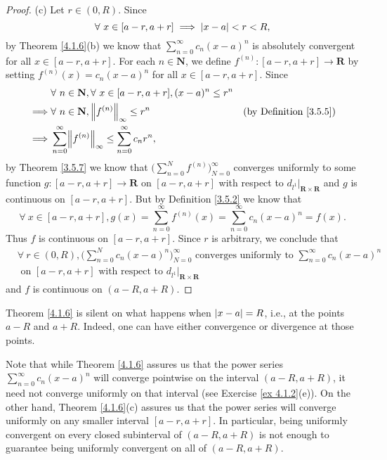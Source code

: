 \begin{proof}{(c)}
    Let \(r \in (0, R)\).
    Since
    \[
        \forall\ x \in [a - r, a + r] \implies \abs*{x - a} < r < R,
    \]
    by Theorem \ref{4.1.6}(b) we know that \(\sum_{n = 0}^\infty c_n (x - a)^n\) is absolutely convergent for all \(x \in [a - r, a + r]\).
    For each \(n \in \mathbf{N}\), we define \(f^{(n)} : [a - r, a + r] \to \mathbf{R}\) by setting \(f^{(n)}(x) = c_n (x - a)^n\) for all \(x \in [a - r, a + r]\).
    Since
    \begin{align*}
                 & \forall\ n \in \mathbf{N}, \forall\ x \in [a - r, a + r], (x - a)^n \leq r^n                                      \\
        \implies & \forall\ n \in \mathbf{N}, \norm*{f^{(n)}}_\infty \leq r^n                   & \text{(by Definition \ref{3.5.5})} \\
        \implies & \sum_{n = 0}^\infty \norm*{f^{(n)}}_\infty \leq \sum_{n = 0}^\infty c_n r^n,
    \end{align*}
    by Theorem \ref{3.5.7} we know that \(\big(\sum_{n = 0}^N f^{(n)}\big)_{N = 0}^\infty\) converges uniformly to some function \(g : [a - r, a + r] \to \mathbf{R}\) on \([a - r, a + r]\) with respect to \(d_{l^1}|_{\mathbf{R} \times \mathbf{R}}\) and \(g\) is continuous on \([a - r, a + r]\).
    But by Definition \ref{3.5.2} we know that
    \[
        \forall\ x \in [a - r, a + r], g(x) = \sum_{n = 0}^\infty f^{(n)}(x) = \sum_{n = 0}^\infty c_n (x - a)^n = f(x).
    \]
    Thus \(f\) is continuous on \([a - r, a + r]\).
    Since \(r\) is arbitrary, we conclude that
    \begin{align*}
         & \forall\ r \in (0, R), \bigg(\sum_{n = 0}^N c_n (x - a)^n\bigg)_{N = 0}^\infty \text{ converges uniformly to } \sum_{n = 0}^\infty c_n (x - a)^n \\
         & \text{ on } [a - r, a + r] \text{ with respect to } d_{l^1}|_{\mathbf{R} \times \mathbf{R}}
    \end{align*}
    and \(f\) is continuous on \((a - R, a + R)\).
\end{proof}

\setcounter{theorem}{7}
\begin{remark}\label{4.1.8}
    Theorem \ref{4.1.6} is silent on what happens when \(\abs*{x - a} = R\), i.e., at the points \(a - R\) and \(a + R\).
    Indeed, one can have either convergence or divergence at those points.
\end{remark}

\begin{remark}\label{4.1.9}
    Note that while Theorem \ref{4.1.6} assures us that the power series \(\sum_{n = 0}^\infty c_n (x - a)^n\) will converge pointwise on the interval \((a - R, a + R)\), it need not converge uniformly on that interval
    (see Exercise \ref{ex 4.1.2}(e)).
    On the other hand, Theorem \ref{4.1.6}(c) assures us that the power series will converge uniformly on any smaller interval \([a - r, a + r]\).
    In particular, being uniformly convergent on every closed subinterval of \((a - R, a + R)\) is not enough to guarantee being uniformly convergent on all of \((a - R, a + R)\).
\end{remark}

